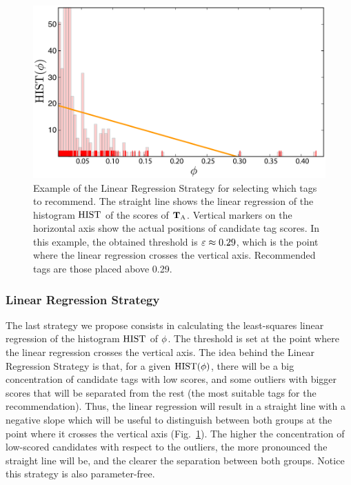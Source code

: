 \begin{figure}
  \centerline{
  \includegraphics[width=\figSizeLarge]{ch03_general/pics/04_linear_regression_example.pdf}}
  \caption[Example of the Linear Regression Strategy for selecting which tags to recommend]{Example of the Linear Regression Strategy for selecting which tags to recommend. The straight line shows the linear regression of the histogram $\text{HIST}$ of the scores of $\mathbf{T}_{\text{A}}$. Vertical markers on the horizontal axis show the actual positions of candidate tag scores. In this example, the obtained threshold is $\varepsilon \approx 0.29$, which is the point where the linear regression crosses the vertical axis. Recommended tags are those placed above 0.29.}
  \label{general:fig:polyfit_example}
\end{figure}


\subsubsection{Linear Regression Strategy}

The last strategy we propose consists in calculating the least-squares linear regression of the histogram $\text{HIST}$ of $\phi$. The threshold is set at the point where the linear regression crosses the vertical axis. 
The idea behind the Linear Regression Strategy is that, for a given $\text{HIST}(\phi)$, there will be a big concentration of candidate tags with low scores, and some outliers with bigger scores that will be separated from the rest (the most suitable tags for the recommendation). Thus, the linear regression will result in a straight line with a negative slope which will be useful to distinguish between both groups at the point where it crosses the vertical axis (Fig.~\ref{general:fig:polyfit_example}). The higher the concentration of low-scored candidates with respect to the outliers, the more pronounced the straight line will be, and the clearer the separation between both groups. 
Notice this strategy is also parameter-free.


